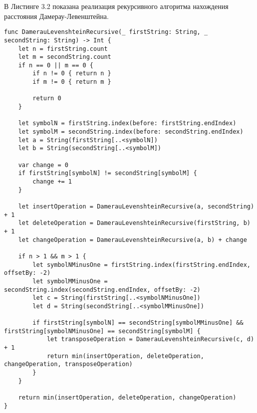 \hspace{0.6cm}В Листинге 3.2 показана реализация рекурсивного алгоритма нахождения расстояния Дамерау-Левенштейна.
\begin{lstlisting}[caption=Функция нахождения расстояния Дамерау-Левенштейна рекурсивно]
func DamerauLevenshteinRecursive(_ firstString: String, _ secondString: String) -> Int {
    let n = firstString.count
    let m = secondString.count
    if n == 0 || m == 0 {
        if n != 0 { return n }
        if m != 0 { return m }
        
        return 0
    }
    
    let symbolN = firstString.index(before: firstString.endIndex)
    let symbolM = secondString.index(before: secondString.endIndex)
    let a = String(firstString[..<symbolN])
    let b = String(secondString[..<symbolM])
    
    var change = 0
    if firstString[symbolN] != secondString[symbolM] {
        change += 1
    }
    
    let insertOperation = DamerauLevenshteinRecursive(a, secondString) + 1
    let deleteOperation = DamerauLevenshteinRecursive(firstString, b) + 1
    let changeOperation = DamerauLevenshteinRecursive(a, b) + change
    
    if n > 1 && m > 1 {
        let symbolNMinusOne = firstString.index(firstString.endIndex, offsetBy: -2)
        let symbolMMinusOne = secondString.index(secondString.endIndex, offsetBy: -2)
        let c = String(firstString[..<symbolNMinusOne])
        let d = String(secondString[..<symbolMMinusOne])
      
        if firstString[symbolN] == secondString[symbolMMinusOne] && firstString[symbolNMinusOne] == secondString[symbolM] {
            let transposeOperation = DamerauLevenshteinRecursive(c, d) + 1
            return min(insertOperation, deleteOperation, changeOperation, transposeOperation)
        }
    }
    
    return min(insertOperation, deleteOperation, changeOperation)
}
\end{lstlisting}

